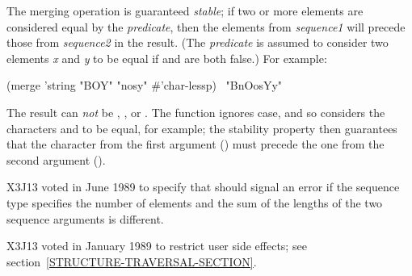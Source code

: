 \begin{defun}[Function]
The merging operation is guaranteed
{\it stable}; if two or more elements are considered equal by the
{\it predicate}, then the elements from {\it sequence1} will
precede those from {\it sequence2} in the result.
(The {\it predicate} is assumed to
consider two elements {\it x} and {\it y} to be equal if
 and
 are both false.)
For example:
\begin{lisp}
(merge 'string "BOY" "nosy" \#'char-lessp) \EV\ "BnOosYy"
\end{lisp}
The result can {\it not} be , , or .
The function  ignores case, and so considers
the characters  and  to be equal, for example;
the stability property then guarantees that the character from the
first argument () must precede the one from the second
argument ().

\begin{newer}
X3J13 voted in June 1989  to specify that
 should signal an error if the sequence type specifies the number of
elements and the sum of the lengths of the two sequence arguments is
different.
\end{newer}

\begin{new}
X3J13 voted in January 1989
to restrict user side effects; see section~\ref{STRUCTURE-TRAVERSAL-SECTION}.
\end{new}
\end{defun}
